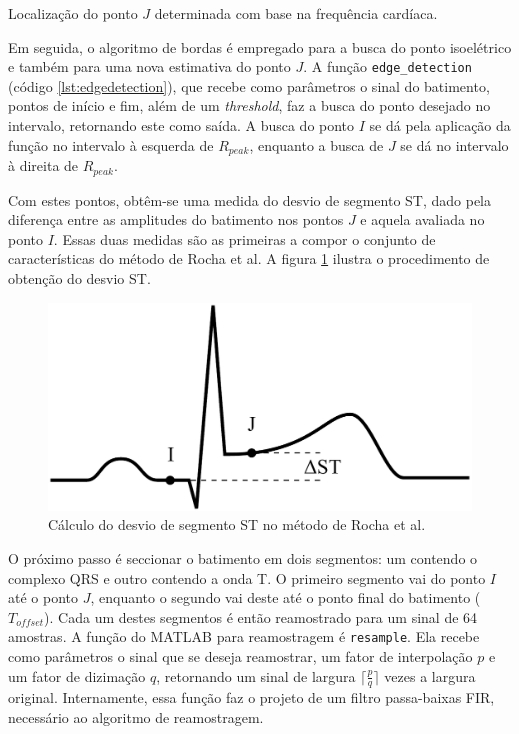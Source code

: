 \begin{table}[ht!]
    \centering
    
    \caption[Localização do ponto $J$ determinada com base na frequência cardíaca]{Localização do ponto $J$ determinada com base na frequência cardíaca.}
    \label{tab:pangpoints}
\end{table}

Em seguida, o algoritmo de bordas é empregado para a busca do ponto isoelétrico e também para uma nova estimativa do ponto $J$. A função \texttt{edge\_detection} (código \ref{lst:edgedetection}), que recebe como parâmetros o sinal do batimento, pontos de início e fim, além de um \emph{threshold}, faz a busca do ponto desejado no intervalo, retornando este como saída. A busca do ponto $I$ se dá pela aplicação da função no intervalo à esquerda de $R_{peak}$, enquanto a busca de $J$ se dá no intervalo à direita de $R_{peak}$.

Com estes pontos, obtêm-se uma medida do desvio de segmento ST, dado pela diferença entre as amplitudes do batimento nos pontos $J$ e aquela avaliada no ponto $I$. Essas duas medidas são as primeiras a compor o conjunto de características do método de Rocha et al. A figura \ref{fig:rochastdev} ilustra o procedimento de obtenção do desvio ST.

\begin{figure}[ht]
    \centering
    \includegraphics[width=350pt]{figures/chap6-rocha-stdev.pdf}
    \caption[Cálculo do desvio de segmento ST]{Cálculo do desvio de segmento ST no método de Rocha et al.}
    \label{fig:rochastdev}
\end{figure}

O próximo passo é seccionar o batimento em dois segmentos: um contendo o complexo QRS e outro contendo a onda T. O primeiro segmento vai do ponto $I$ até o ponto $J$, enquanto o segundo vai deste até o ponto final do batimento ($T_{offset}$). Cada um destes segmentos é então reamostrado para um sinal de 64 amostras. A função do MATLAB para reamostragem é \texttt{resample}. Ela recebe como parâmetros o sinal que se deseja reamostrar, um fator de interpolação $p$ e um fator de dizimação $q$, retornando um sinal de largura $\lceil\frac{p}{q}\rceil$ vezes a largura original. Internamente, essa função faz o projeto de um filtro passa-baixas FIR, necessário ao algoritmo de reamostragem.

